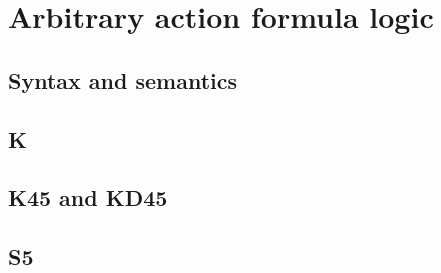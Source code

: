 \chapter{Arbitrary action formula logic}\label{aafl}

\section{Syntax and semantics}

\section{K}

\section{K45 and KD45}

\section{S5}
